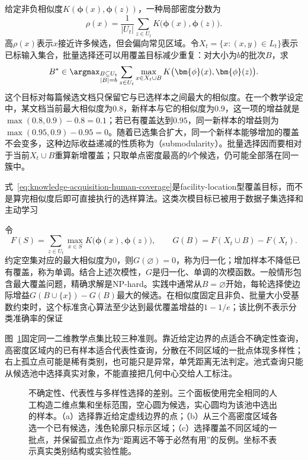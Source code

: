 给定非负相似度$K(\bm{\phi}(x),\bm{\phi}(z))$，一种局部密度分数为
\begin{equation}
  \rho(x)=\frac{1}{|U_t|}
  \sum_{z\in U_t}K\bigl(\bm{\phi}(x),\bm{\phi}(z)\bigr).
  \label{eq:knowledge-acquisition-human-density}
\end{equation}
高$\rho(x)$表示$x$接近许多候选，但会偏向常见区域。令$X_t=\{x:(x,y)\in L_t\}$表示已标输入集合，批量选择还可以用覆盖目标减少重复：对大小为$b$的批次$B$，求
\begin{equation}
  B^\ast\in\argmax_{\substack{B\subseteq U_t\\|B|=b}}
  \sum_{z\in U_t}
  \max_{x\in X_t\cup B}
  K\bigl(\bm{\phi}(x),\bm{\phi}(z)\bigr).
  \label{eq:knowledge-acquisition-human-coverage}
\end{equation}
这个目标对每篇候选文档只保留它与已选样本之间最大的相似度。在一个教学设定中，某文档当前最大相似度为$0.8$，新样本与它的相似度为$0.9$，这一项的增益就是$\max(0.8,0.9)-0.8=0.1$；若已有覆盖达到$0.95$，同一新样本的增益则为$\max(0.95,0.9)-0.95=0$。随着已选集合扩大，同一个新样本能够增加的覆盖不会变多，这种边际收益递减的性质称为（submodularity）。批量选择因而要相对于当前$X_t\cup B$重算新增覆盖；只取单点密度最高的$b$个候选，仍可能全部落在同一簇中。

式~\eqref{eq:knowledge-acquisition-human-coverage}是facility-location型覆盖目标，而不是算完相似度后即可直接执行的选样算法。这类次模目标已被用于数据子集选择和主动学习

令
\[
  F(S)=\sum_{z\in U_t}\max_{x\in S}
  K\bigl(\bm{\phi}(x),\bm{\phi}(z)\bigr),
  \qquad
  G(B)=F(X_t\cup B)-F(X_t).
\]
约定空集对应的最大相似度为0，则$G(\varnothing)=0$，称为归一化；增加样本不降低已有覆盖，称为单调。结合上述次模性，$G$是归一化、单调的次模函数。一般情形包含最大覆盖问题，精确求解是NP-hard。实践中通常从$B=\varnothing$开始，每轮选择使边际增益$G(B\cup\{x\})-G(B)$最大的候选。在相似度固定且非负、批量大小受基数约束时，这个标准贪心算法至少达到最优覆盖增益的$1-1/e$；该比例不表示分类准确率的保证

图~\ref{fig:knowledge-acquisition-human-selection-criteria}固定同一二维教学点集比较三种准则。靠近给定边界的点适合不确定性查询，高密度区域内的已有样本适合代表性查询，分散在不同区域的一批点体现多样性；右上孤立点可能是稀有类别，也可能只是异常，单凭距离无法判定。池式查询只能从候选池中选择真实对象，不能直接把几何中心交给人工标注。

\begin{figure}[htbp]
  \centering
  
  \caption{不确定性、代表性与多样性选择的差别。三个面板使用完全相同的人工构造二维点集和坐标范围，空心圆为候选，实心圆均为该池中选出的样本。（a）选择靠近给定虚线边界的点；（b）从三个高密度区域各选一个已有候选，浅色轮廓只标示区域；（c）选择覆盖不同区域的一批点，并保留孤立点作为“距离远不等于必然有用”的反例。坐标不表示真实类别结构或实验性能。}
  \label{fig:knowledge-acquisition-human-selection-criteria}
\end{figure}


